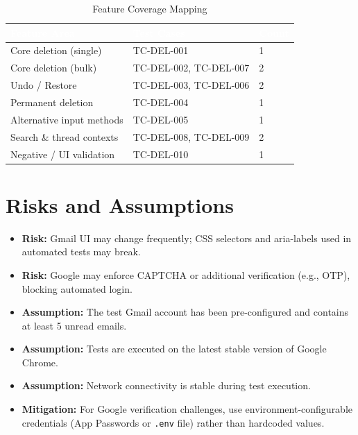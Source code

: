 \documentclass[12pt,a4paper]{article}
\begin{document}
\begin{table}[h!]
\centering
\caption{Feature Coverage Mapping}
\begin{tabular}{|L{5cm}|L{5cm}|C{3cm}|}
\hline
{}
\textcolor{white}{\textbf{Feature Area}} & \textcolor{white}{\textbf{Test Cases}} & \textcolor{white}{\textbf{Count}} \\
\hline
Core deletion (single)      & TC-DEL-001                   & 1 \\ \hline
Core deletion (bulk)        & TC-DEL-002, TC-DEL-007       & 2 \\ \hline
Undo / Restore              & TC-DEL-003, TC-DEL-006       & 2 \\ \hline
Permanent deletion          & TC-DEL-004                   & 1 \\ \hline
Alternative input methods   & TC-DEL-005                   & 1 \\ \hline
Search \& thread contexts   & TC-DEL-008, TC-DEL-009       & 2 \\ \hline
Negative / UI validation    & TC-DEL-010                   & 1 \\ \hline
\end{tabular}
\end{table}

\section{Risks and Assumptions}

\begin{itemize}[noitemsep]
    \item \textbf{Risk:} Gmail UI may change frequently; CSS selectors and aria-labels used in automated tests may break.
    \item \textbf{Risk:} Google may enforce CAPTCHA or additional verification (e.g., OTP), blocking automated login.
    \item \textbf{Assumption:} The test Gmail account has been pre-configured and contains at least 5 unread emails.
    \item \textbf{Assumption:} Tests are executed on the latest stable version of Google Chrome.
    \item \textbf{Assumption:} Network connectivity is stable during test execution.
    \item \textbf{Mitigation:} For Google verification challenges, use environment-configurable credentials (App Passwords or \texttt{.env} file) rather than hardcoded values.
\end{itemize}
\end{document}
